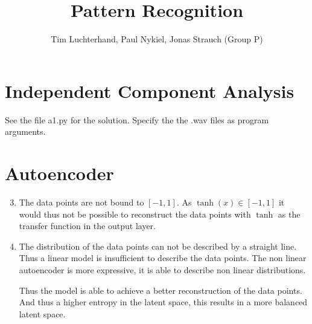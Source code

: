 \documentclass[DIN, pagenumber=false, fontsize=11pt, parskip=half]{scrartcl}
\title{Pattern Recognition}
\author{Tim Luchterhand, Paul Nykiel, Jonas Strauch (Group P)}
\begin{document}
    \maketitle
    \section{Independent Component Analysis}
    See the file a1.py for the solution. Specify the the .wav files as program arguments.

    \section{Autoencoder}
    \begin{enumerate}
        \setcounter{enumi}{2}
        \item The data points are not bound to $[-1, 1]$. As $\tanh(x) \in [-1, 1]$ it would thus not be possible
            to reconstruct the data points with $\tanh$ as the transfer function in the output layer.

        \item The distribution of the data points can not be described by a straight line. Thus a linear
            model is insufficient to describe the data points. The non linear autoencoder is more expressive,
            it is able to describe non linear distributions.
            
            Thus the model is able to achieve a better reconstruction of the data points. And thus a higher entropy
            in the latent space, this results in a more balanced latent space.
    \end{enumerate}
\end{document}
